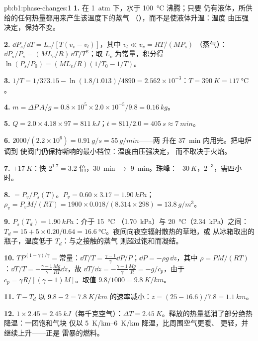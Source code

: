 \begin{solution}{pb:b1:phase-changes:1}
\textbf{1.} 在 \qty{1}{atm} 下，水于 \qty{100}{\degreeCelsius} 沸腾；只要
仍有液体，所供给的任何热量都用来产生该温度下的蒸气
（），而不是使液体升温：温度
由压强决定，保持不变。

\textbf{2.} $\dd P_s/\dd T = L_v/[T(v_v - v_l)]$，其中 $v_l \ll v_v = RT/(MP_s)$
（蒸气）：$\dd P_s/P_s = (ML_v/R)\,\dd T/T^2$；取 $L_v$
为常量，积分得 $\ln(P_s/P_0) = (ML_v/R)(1/T_0 - 1/T)$。

\textbf{3.} $1/T = 1/373.15 - \ln(1.8/1.013)/4890 = 2.562 \times 10^{-3}$：$T =
\qty{390}{K} = \qty{117}{\degreeCelsius}$。

\textbf{4.} $m = \Delta P\,A/g = 0.8 \times 10^5 \times 2.0 \times 10^{-5}/9.8 =
\qty{0.16}{kg}$。

\textbf{5.} $Q = 2.0 \times 4.18 \times 97 = \qty{811}{kJ}$；$t = 811/2.0 =
\qty{405}{s} \approx \qty{7}{min}$。

\textbf{6.} $2000/(2.2 \times 10^6) = \qty{0.91}{g/s} = \qty{55}{g/min}$——两
升在 \qty{37}{min} 内用完。把电炉调到
使阀门仍保持嘶响的最小档位：温度由压强决定，
而不取决于火焰。

\textbf{7.} $+\qty{17}{K}$：快 $2^{1.7} = 3.2$ 倍，\qty{30}{min}
$\to$ \qty{9}{min}。珠峰：$-\qty{30}{K}$，$2^{-3}$，需四小时。

\textbf{8.}  $= P_v/P_s(T)$。$P_v = 0.60 \times 3.17 =
\qty{1.90}{kPa}$；$\rho_v = P_vM/(RT) = 1900 \times 0.018/(8.314 \times 298) =
\qty{13.8}{g/m^3}$。

\textbf{9.} $P_s(T_d) = \qty{1.90}{kPa}$：介于 \qty{15}{\degreeCelsius}
（\qty{1.70}{kPa}）与 \qty{20}{\degreeCelsius}（\qty{2.34}{kPa}）之间：$T_d = 15 + 5 \times 0.20/0.64
= \qty{16.6}{\degreeCelsius}$。夜间向夜空辐射散热的草地，或
从冰箱取出的瓶子，温度低于 $T_d$：与之接触的蒸气
则超过饱和而凝结。

\textbf{10.} $TP^{(1-\gamma)/\gamma} = \text{常量}$：$\dd T/T = \frac{\gamma - 1}{\gamma}
\dd P/P$；$\dd P = -\rho g\,\dd z$，其中 $\rho = PM/(RT)$：$\dd T/T = -\frac{\gamma -
1}{\gamma}\frac{Mg}{RT}\dd z$，故 $\dd T/\dd z = -\frac{\gamma - 1}{\gamma}\frac{Mg}{R} =
-g/c_p$，由于 $c_p = \gamma R/[(\gamma - 1)M]$。取值 $9.8/1000 = \qty{9.8}{K/km}$。

\textbf{11.} $T - T_d$ 以 $9.8 - 2 = \qty{7.8}{K/km}$ 的速率减小：$z = (25 - 16.6)/
7.8 = \qty{1.1}{km}$。

\textbf{12.} $1 \times 2.45 = \qty{2.45}{kJ}$（每千克空气）：$\Delta T =
\qty{2.45}{K}$。释放的热量抵消了部分绝热降温：一团饱和气块
仅以 \qtyrange{5}{6}{K/km} 降温，比周围空气更暖、
更轻，并继续上升——正是
雷暴的燃料。


\end{solution}
